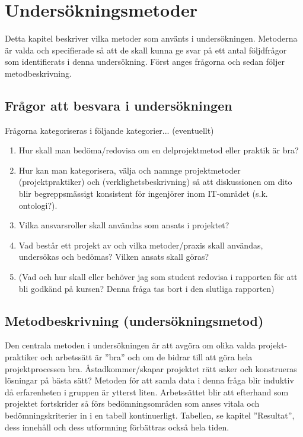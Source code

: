 
\section{Undersökningsmetoder}
Detta kapitel beskriver vilka metoder som använts i undersökningen. Metoderna är
valda och specifierade så att de skall kunna ge svar på ett antal följdfrågor som
identifierats i denna undersökning. Först anges frågorna och sedan följer
metodbeskrivning.

\subsection{Frågor att besvara i undersökningen}
Frågorna kategoriseras i följande kategorier... (eventuellt)
\begin{enumerate}
    \item Hur skall man bedöma/redovisa om en delprojektmetod eller praktik är bra?
    \item Hur kan man kategorisera, välja och namnge projektmetoder (projektpraktiker)
    och (verklighetsbeskrivning) så att diskussionen om dito blir begreppsmässigt
    konsistent för ingenjörer inom IT-området (s.k. ontologi?).
    \item Vilka ansvarsroller skall användas som ansats i projektet?
    \item Vad består ett projekt av och vilka metoder/praxis skall användas, undersökas
    och bedömas? Vilken ansats skall göras?
    \item (Vad och hur skall eller behöver jag som student redovisa i rapporten för att
    bli godkänd på kursen? Denna fråga tas bort i den slutliga rapporten)
\end{enumerate}

\subsection{Metodbeskrivning (undersökningsmetod)}
Den centrala metoden i undersökningen är att avgöra om olika valda projekt-praktiker 
och arbetssätt är ”bra” och om de bidrar till att göra hela projektprocessen bra. 
Åstadkommer/skapar projektet rätt saker och konstrueras lösningar på bästa sätt? 
Metoden för att samla data i denna fråga blir induktiv då erfarenheten i gruppen är 
ytterst liten. Arbetssättet blir att efterhand som projektet fortskrider så förs 
bedömningsområden som anses vitala och bedömningskriterier in i en tabell kontinuerligt. 
Tabellen, se kapitel ”Resultat”, dess innehåll och dess utformning förbättras också hela 
tiden.\\

